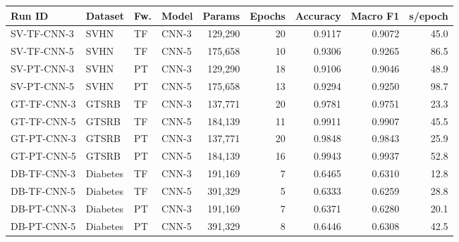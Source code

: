 \begin{tabular}{llllrrrrr}
\toprule
Run ID & Dataset & Fw. & Model & Params & Epochs & Accuracy & Macro F1 & s/epoch \\
\midrule
SV-TF-CNN-3 & SVHN & TF & CNN-3 & 129,290 & 20 & 0.9117 & 0.9072 & 45.0 \\
SV-TF-CNN-5 & SVHN & TF & CNN-5 & 175,658 & 10 & 0.9306 & 0.9265 & 86.5 \\
SV-PT-CNN-3 & SVHN & PT & CNN-3 & 129,290 & 18 & 0.9106 & 0.9046 & 48.9 \\
SV-PT-CNN-5 & SVHN & PT & CNN-5 & 175,658 & 13 & 0.9294 & 0.9250 & 98.7 \\
\midrule
GT-TF-CNN-3 & GTSRB & TF & CNN-3 & 137,771 & 20 & 0.9781 & 0.9751 & 23.3 \\
GT-TF-CNN-5 & GTSRB & TF & CNN-5 & 184,139 & 11 & 0.9911 & 0.9907 & 45.5 \\
GT-PT-CNN-3 & GTSRB & PT & CNN-3 & 137,771 & 20 & 0.9848 & 0.9843 & 25.9 \\
GT-PT-CNN-5 & GTSRB & PT & CNN-5 & 184,139 & 16 & 0.9943 & 0.9937 & 52.8 \\
\midrule
DB-TF-CNN-3 & Diabetes & TF & CNN-3 & 191,169 & 7 & 0.6465 & 0.6310 & 12.8 \\
DB-TF-CNN-5 & Diabetes & TF & CNN-5 & 391,329 & 5 & 0.6333 & 0.6259 & 28.8 \\
DB-PT-CNN-3 & Diabetes & PT & CNN-3 & 191,169 & 7 & 0.6371 & 0.6280 & 20.1 \\
DB-PT-CNN-5 & Diabetes & PT & CNN-5 & 391,329 & 8 & 0.6446 & 0.6308 & 42.5 \\
\bottomrule
\end{tabular}
